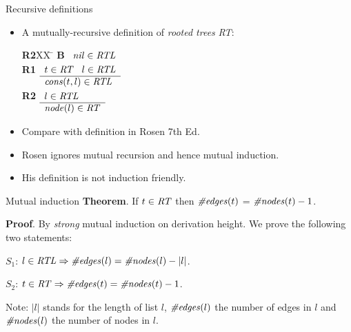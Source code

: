 \documentclass[style=sailor,size=12pt]{powerdot}
\newcommand{\id}[1]{\mbox{\it #1\/}}
\begin{document}
\begin{wideslide}[bm=,toc=]{Recursive definitions}
\begin{itemize}
\item A mutually-recursive definition of {\em rooted trees\/} {\em RT\/}:
\begin{tabbing}
{\bf R2}XX \=  \kill
{\bf B} \>
        \(\begin{array}[t]{l}
        \id{nil}\in\id{RTL}
        \end{array}\) \\[2ex]
{\bf R1} \>
        \(\begin{array}[t]{l}
        t\in\id{RT}\;\;\;l\in\id{RTL} \\
        \hline
        \id{cons}(t,l)\in\id{RTL}
        \end{array}\) \\[2ex]
{\bf R2} \>
        \(\begin{array}[t]{l}
        l\in\id{RTL} \\
        \hline
        \id{node}(l)\in\id{RT}
        \end{array}\)
\end{tabbing}
\item Compare with definition in Rosen 7th Ed.
\item Rosen ignores mutual recursion and hence mutual induction.
\item His definition is not induction friendly.
\end{itemize}
\end{wideslide}

\begin{wideslide}[bm=,toc=]{Mutual induction}
{\bf Theorem}. If $t\in\id{RT}$ then $\id{\#edges}(t)$ = $\id{\#nodes}(t) - 1$.
\vspace{1em}

{\bf Proof}.  By {\em strong\/} mutual induction on derivation height. 
We prove the following two statements:
\vspace{1em}

$S_1$: $l\in \id{RTL}\Rightarrow \id{\#edges}(l) = \id{\#nodes}(l) - |l|$.

$S_2$: $t\in \id{RT}\Rightarrow \id{\#edges}(t) = \id{\#nodes}(t) - 1$.

\vspace{2em}
Note: $|l|$ stands for the length of list $l$, $\id{\#edges}(l)$ the number of edges in $l$
and $\id{\#nodes}(l)$ the number of nodes in $l$.
\end{wideslide}
\end{document}
